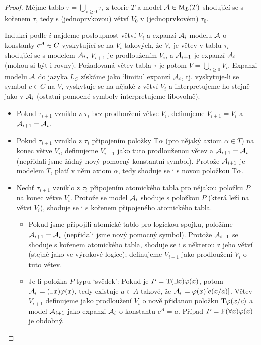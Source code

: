 \begin{proof}
    Mějme tablo $\tau=\bigcup_{i\geq 0}\tau_i$ z teorie $T$ a model $\mathcal{A}\in\operatorname{M}_L(T)$ shodující se s kořenem $\tau$, tedy s (jednoprvkovou) větví $V_0$ v (jednoprvkovém) $\tau_0$.
    
    Indukcí podle $i$ najdeme posloupnost větví $V_i$ a expanzí $\mathcal{A}_i$ modelu $\mathcal{A}$ o konstanty $c^{\mathcal{A}}\in C$ vyskytující se na $V_i$ takových, že $V_i$ je větev v tablu $\tau_i$ shodující se s modelem $\mathcal{A}_i$, $V_{i+1}$ je prodloužením $V_i$, a $\mathcal{A}_{i+1}$ je expanzí $\mathcal{A}_i$ (mohou si být i rovny). Požadovaná větev tabla $\tau$ je potom $V=\bigcup_{i\geq 0}V_i$. Expanzi modelu $\mathcal{A}$ do jazyka $L_C$ získáme jako `limitu' expanzí $\mathcal{A}_i$, tj. vyskytuje-li se symbol $c\in C$ na $V$, vyskytuje se na nějaké z větví $V_i$ a interpretujeme ho stejně jako v $\mathcal{A}_i$ (ostatní pomocné symboly interpretujeme libovolně).
    \begin{itemize}
        \item Pokud $\tau_{i+1}$ vzniklo z $\tau_i$ bez prodloužení větve $V_i$, definujeme $V_{i+1}=V_i$ a $\mathcal{A}_{i+1}=\mathcal{A}_{i}$.
        \item Pokud $\tau_{i+1}$ vzniklo z $\tau_i$ připojením položky $\mathrm{T}\alpha$ (pro nějaký axiom $\alpha\in T$) na konec větve  $V_i$, definujeme $V_{i+1}$ jako tuto prodlouženou větev a $\mathcal{A}_{i+1}=\mathcal{A}_i$ (nepřidali jsme žádný nový pomocný konstantní symbol). Protože $\mathcal{A}_{i+1}$ je modelem $T$, platí v něm axiom $\alpha$, tedy shoduje se i s novou položkou $\mathrm{T}\alpha$.
        \item Nechť $\tau_{i+1}$ vzniklo z $\tau_i$ připojením atomického tabla pro nějakou položku $P$ na konec větve $V_i$. Protože se model $\mathcal{A}_i$ shoduje s položkou $P$ (která leží na větvi $V_i$), shoduje se i s kořenem připojeného atomického tabla.
        \begin{itemize}
            \item Pokud jsme připojili atomické tablo pro logickou spojku, položíme $\mathcal{A}_{i+1}=\mathcal{A}_i$ (nepřidali jsme nový pomocný symbol). Protože $\mathcal{A}_{i+1}$ se shoduje s kořenem atomického tabla, shoduje se i s některou z jeho větví (stejně jako ve výrokové logice); definujeme $V_{i+1}$ jako prodloužení $V_i$ o tuto větev.
            \item Je-li položka $P$ typu `svědek': Pokud je $P=\mathrm{T}(\exists x)\varphi(x)$, potom $\mathcal{A}_i\models(\exists x)\varphi(x)$, tedy existuje $a\in A$ takové, že $\mathcal{A}_i\models\varphi(x)[e(x/a)]$. Větev $V_{i+1}$ definujeme jako prodloužení $V_i$ o nově přidanou položku $\mathrm{T}\varphi(x/c)$ a model $\mathcal{A}_{i+1}$ jako expanzi $\mathcal{A}_i$ o konstantu $c^A=a$. Případ $P=\mathrm{F}(\forall x)\varphi(x)$ je obdobný.

\end{itemize}
\end{itemize}
\end{proof}
